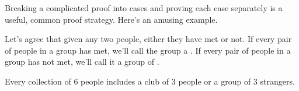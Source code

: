 \iffalse

\begin{notesproblem}
Reformulate the proof of the Distributive Law for Sets as a chain of
if-and-only-if implications.
\end{notesproblem}
\fi



Breaking a complicated proof into cases and proving each case separately
is a useful, common proof strategy.  Here's an amusing example.

Let's agree that given any two people, either they have met or not.  If
every pair of people in a group has met, we'll call the group a
.  If every pair of people in a group has not met, we'll call
it a group of .

\begin{theorem*}
Every collection of 6 people includes a club of 3 people or a group of 3
strangers.
\end{theorem*}

